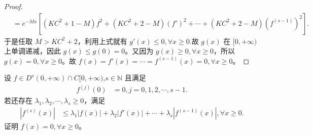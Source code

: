 \documentclass[../../main.tex]{subfiles}
\begin{document}
\begin{proof}
\begin{align*}
&=e^{-Mx}\left[ \left( KC^2+1-M \right) f^2+\left( KC^2+2-M \right) \left( f' \right) ^2+\cdots +\left( KC^2+2-M \right) \left( f^{\left( s-1 \right)} \right) ^2 \right] .
\end{align*}
于是任取 $M>KC^2+2$，利用上式就有 $g'\left( x \right) \leqslant 0,\forall x\geq 0$.故 $g\left( x \right)$ 在 $[0,+\infty )$ 上单调递减，因此 $g\left( x \right) \leqslant g\left( 0 \right) =0$。又因为 $g\left( x \right) \geqslant 0,\forall x\geqslant 0$，所以 $g\left( x \right) =0,\forall x\geqslant 0$。故
$f\left( x \right) =f'\left( x \right) =\cdots =f^{\left( s-1 \right)}\left( x \right) =0,\forall x\geqslant 0$。
\end{proof}

\begin{proposition}\label{proposition:关于导数求和不等式问题}
设 $f \in D^s(0,+\infty) \cap C[0,+\infty)$,$s \in \mathbb{N}$ 且满足
\begin{align*}
f^{(j)}(0) &= 0, j = 0, 1, 2, \cdots, s - 1.
\end{align*}
若还存在 $\lambda_1, \lambda_2, \cdots, \lambda_s \geq 0$，满足
\begin{align}\label{aaaaproposition7.19-0.1}
\left| f^{(s)}(x) \right| &\leq \lambda_1 \left| f(x) \right| + \lambda_2 \left| f'(x) \right| + \cdots + \lambda_s \left| f^{(s-1)}(x) \right|, \forall x \geq 0.
\end{align}
证明 $f(x) = 0, \forall x \geq 0$。
\end{proposition}
\end{document}

